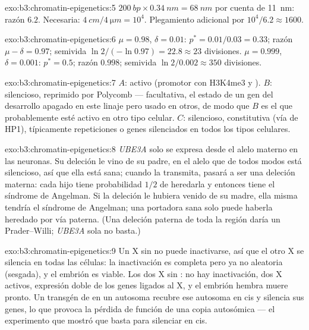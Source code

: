 \begin{solution}{exo:b3:chromatin-epigenetics:5}
$\qty{200}{bp}\times \qty{0.34}{nm} = \qty{68}{nm}$ por cuenta de
\qty{11}{nm}: razón $6.2$. Necesaria: $\qty{4}{cm}/\qty{4}{\micro m} =
10^{4}$. Plegamiento adicional por $10^{4}/6.2 \approx 1600$.
\end{solution}

\begin{solution}{exo:b3:chromatin-epigenetics:6}
$\mu = 0.98$, $\delta = 0.01$: $p^{*} = 0.01/0.03 = 0.33$; razón $\mu -
\delta = 0.97$; semivida $\ln 2/(-\ln 0.97) = 22.8 \approx 23$
divisiones. $\mu = 0.999$, $\delta = 0.001$: $p^{*} = 0.5$; razón
$0.998$; semivida $\ln 2 / 0.002 \approx 350$ divisiones.
\end{solution}

\begin{solution}{exo:b3:chromatin-epigenetics:7}
$A$: activo (promotor con H3K4me3 y ). $B$: silencioso,
reprimido por Polycomb ---  facultativa, el estado de un
gen del desarrollo apagado en este linaje pero usado en otros, de modo
que $B$ es el que probablemente esté activo en otro tipo celular. $C$:
silencioso,  constitutiva (vía de HP1), típicamente
repeticiones o genes silenciados en todos los tipos celulares.
\end{solution}

\begin{solution}{exo:b3:chromatin-epigenetics:8}
\emph{UBE3A} solo se expresa desde el alelo materno en las neuronas. Su
deleción le vino de su padre, en el alelo que de todos modos está
silencioso, así que ella está sana; cuando la transmita, pasará a ser una
deleción materna: cada hijo tiene probabilidad $1/2$ de heredarla y
entonces tiene el síndrome de Angelman. Si la deleción le hubiera venido
de su madre, ella misma tendría el síndrome de Angelman; una portadora
sana solo puede haberla heredado por vía paterna. (Una deleción paterna
de toda la región daría un Prader--Willi; \emph{UBE3A} sola no basta.)
\end{solution}

\begin{solution}{exo:b3:chromatin-epigenetics:9}
Un X sin \emph{} no puede inactivarse, así que el otro X se silencia
en todas las células: la inactivación es completa pero ya no aleatoria
(sesgada), y el embrión es viable. Los dos X sin \emph{}: no hay
inactivación, dos X activos, expresión doble de los genes ligados al X, y
el embrión hembra muere pronto. Un transgén de \emph{} en un autosoma
recubre ese autosoma en cis y silencia sus genes, lo que provoca la
pérdida de función de una copia autosómica --- el experimento que mostró
que \emph{} basta para silenciar en cis.
\end{solution}

